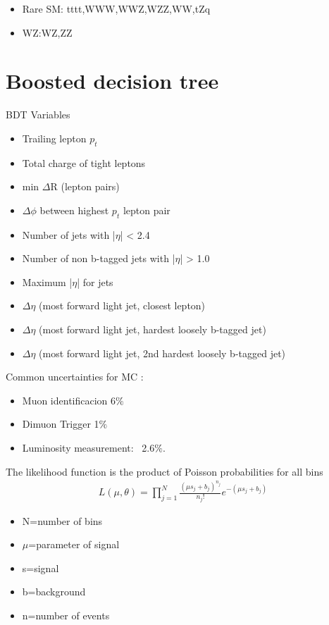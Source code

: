 \begin{linenumbers}
\begin{itemize}
	\item Rare SM: tttt,WWW,WWZ,WZZ,WW,tZq
	\item WZ:WZ,ZZ
\end{itemize}

\section{Boosted decision tree}
BDT Variables 

\begin{itemize}
\item	Trailing lepton $p_{t}$
\item 	Total charge of tight leptons
\item 	min $\Delta$R (lepton pairs)
\item 	$\Delta\phi$ between highest $p_t$ lepton pair
\item 	Number of jets with |$\eta$| < 2.4
\item	Number of non b-tagged jets with |$\eta$| > 1.0
\item	Maximum |$\eta$| for jets
\item	$\Delta\eta$ (most forward light jet, closest lepton)
\item	$\Delta\eta$ (most forward light jet, hardest loosely b-tagged jet)
\item	$\Delta\eta$ (most forward light jet, 2nd hardest loosely b-tagged jet)
\end{itemize}

Common uncertainties for MC :
\begin{itemize}
	\item Muon identificacion 6$\%$
	\item Dimuon Trigger  1$\%$ 
	\item Luminosity measurement: ~2.6$\%$.
\end{itemize}




The likelihood function is the product of Poisson probabilities for all bins
\begin{align}
L(\mu,\theta)=\prod_{j=1}^{N}\frac{(\mu s_j +b_j)^{n_j}}{n_j !}e^{-(\mu s_j+b_j)}
\end{align}

\begin{itemize}
	\item	N=number of bins
	\item	$\mu$=parameter of signal
	\item	s=signal
	\item	b=background
	\item	n=number of events
\end{itemize}



\end{linenumbers}
